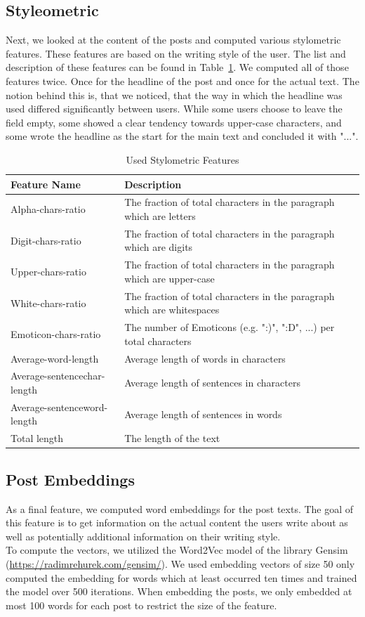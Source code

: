 \documentclass[acmsmall]{acmart}
\begin{document}
\subsection{Styleometric}
Next, we looked at the content of the posts and computed various stylometric features. These features are based on the writing style of the user. The list and description of these features can be found in Table~\ref{tab:stylometric}. We computed all of those features twice. Once for the headline of the post and once for the actual text. The notion behind this is, that we noticed, that the way in which the headline was used differed significantly between users. While some users choose to leave the field empty, some showed a clear tendency towards upper-case characters, and some wrote the headline as the start for the main text and concluded it with "...". 

\begin{table}[H]
\begin{tabular}{ll}
Feature Name & Description \\ \hline
Alpha-chars-ratio & The fraction of total characters in the paragraph which are letters \\
Digit-chars-ratio & The fraction of total characters in the paragraph which are digits \\
Upper-chars-ratio & The fraction of total characters in the paragraph which are upper-case \\
White-chars-ratio & The fraction of total characters in the paragraph which are whitespaces \\
Emoticon-chars-ratio & The number of Emoticons (e.g. ":)", ":D", ...) per total characters \\
Average-word-length & Average length of words in characters \\
Average-sentencechar-length & Average length of sentences in characters \\
Average-sentenceword-length & Average length of sentences in words \\
Total length & The length of the text \\
\end{tabular}
\caption{Used Stylometric Features}
\label{tab:stylometric}
\end{table}

\subsection{Post Embeddings}
As a final feature, we computed word embeddings for the post texts. The goal of this feature is to get information on the actual content the users write about as well as potentially additional information on their writing style. \\
To compute the vectors, we utilized the Word2Vec model of the library Gensim (\url{https://radimrehurek.com/gensim/}). 
We used embedding vectors of size 50 only computed the embedding for words which at least occurred ten times and trained the model over 500 iterations. 
When embedding the posts, we only embedded at most 100 words for each post to restrict the size of the feature.  
\end{document}
